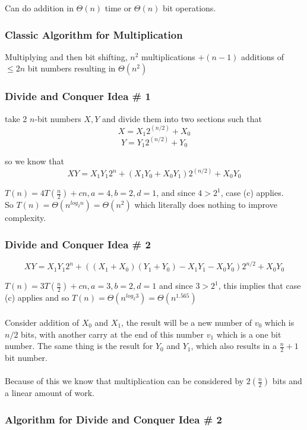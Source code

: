 \documentclass[12pt]{article}
\begin{document}
Can do addition in $\Theta (n)$ time or $\Theta (n)$ bit operations.

\subsubsection{Classic Algorithm for Multiplication}

Multiplying and then bit shifting, $n^2$ multiplications $+ (n-1)$ additions of $\leq 2n$ bit numbers resulting in $\Theta (n^2)$

\subsubsection{Divide and Conquer Idea \# 1}

take 2 $n$-bit numbers $X,Y$ and divide them into two sections such that
$$X = X_1 2^{(n/2)} + X_0$$
$$Y = Y_1 2^{(n/2)} + Y_0$$

so we know that
$$XY = X_1 Y_1 2^n + (X_1 Y_0 + X_0 Y_1) 2^{(n/2)} + X_0 Y_0 $$

$T(n) = 4T(\frac{n}{2}) +cn, a=4, b=2, d=1$, and since $4 > 2^1$, case (c) applies.\\
So $T(n) = \Theta (n^{log_2 n}) = \Theta (n^2)$ which literally does nothing to improve complexity.

\subsubsection{Divide and Conquer Idea \# 2}

$$XY = X_1 Y_1 2^n + ((X_1 + X_0)(Y_1 + Y_0) - X_1 Y_1 - X_0 Y_0) 2^{n/2} + X_0 Y_0$$

$T(n) = 3 T(\frac{n}{2}) + cn, a=3, b=2, d=1$ and since $3 > 2^1$, this implies that case (c) applies and so $T(n) = \Theta (n^{log_2 3}) = \Theta (n^{1.565})$\\
\\
Consider addition of $X_0$ and $X_1$, the result will be a new number of $v_0$ which is $n/2$ bits, with another carry at the end of this number $v_1$ which is a one bit number. The same thing is the result for $Y_0$ and $Y_1$, which also results in a $\frac{n}{2} + 1$ bit number.\\
\\
Because of this we know that multiplication can be considered by $2(\frac{n}{2})$ bits and a linear amount of work.

\subsubsection{Algorithm for Divide and Conquer Idea \# 2}
\end{document}
